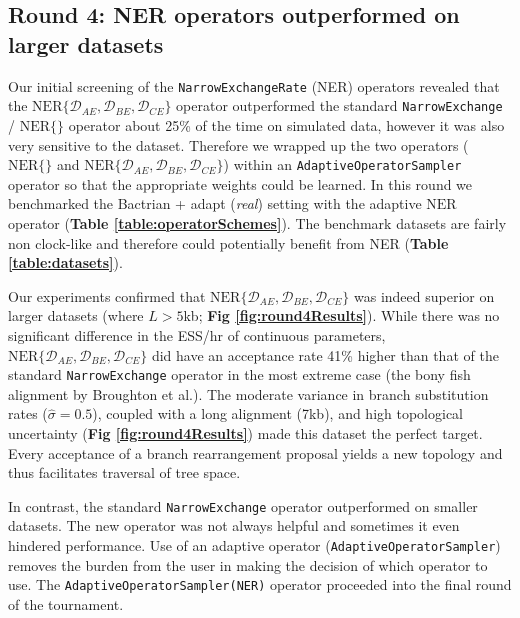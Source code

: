 \documentclass[10pt,letterpaper]{article}
\begin{document}
\subsection*{Round 4: NER operators outperformed on larger datasets}


Our initial screening of the \texttt{NarrowExchangeRate} (NER) operators revealed that the $\text{NER}\{\mathcal{D}_{AE}, \mathcal{D}_{BE}, \mathcal{D}_{CE}\}$ operator outperformed the standard  \texttt{NarrowExchange} / $\text{NER} \{\}$ operator about 25\% of the time on simulated data, however it was also very sensitive to the dataset. 
Therefore we wrapped up the two operators ($\text{NER} \{\}$ and $\text{NER}\{\mathcal{D}_{AE}, \mathcal{D}_{BE}, \mathcal{D}_{CE}\}$) within an \texttt{AdaptiveOperatorSampler} operator so that the appropriate weights could be learned.
In this round we benchmarked the Bactrian + adapt (\textit{real}) setting with the adaptive $\text{NER}$ operator (\textbf{Table \ref{table:operatorSchemes}}).
The benchmark datasets are fairly non clock-like and therefore could potentially benefit from NER (\textbf{Table \ref{table:datasets}}).   


Our experiments confirmed that $\text{NER}\{\mathcal{D}_{AE}, \mathcal{D}_{BE}, \mathcal{D}_{CE}\}$ was indeed superior on larger datasets (where $L > 5$kb; \textbf{Fig \ref{fig:round4Results}}).
While there was no significant difference in the ESS/hr of continuous parameters, $\text{NER}\{\mathcal{D}_{AE}, \mathcal{D}_{BE}, \mathcal{D}_{CE}\}$ did have an acceptance rate 41\% higher than that of the standard \texttt{NarrowExchange} operator in the most extreme case (the bony fish alignment by Broughton et al.\cite{Broughton_2013}).
The moderate variance in branch substitution rates ($\hat{\sigma} = 0.5$), coupled with a long alignment (7kb), and high topological uncertainty (\textbf{Fig \ref{fig:round4Results}}) made this dataset the perfect target. 
Every acceptance of a branch rearrangement proposal yields a new topology and thus facilitates traversal of tree space. 


In contrast, the standard \texttt{NarrowExchange} operator outperformed on smaller datasets.
The new operator was not always helpful and sometimes it even hindered performance.
Use of an adaptive operator (\texttt{AdaptiveOperatorSampler}) removes the burden from the user in making the decision of which operator to use.
The \texttt{AdaptiveOperatorSampler(NER)} operator proceeded into the final round of the tournament.
\end{document}
